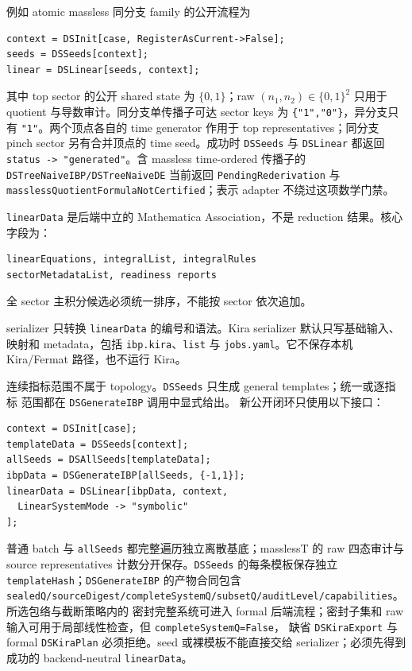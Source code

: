 ﻿\documentclass[a4paper,11pt]{article}
\begin{document}
例如 atomic massless 同分支 family 的公开流程为
\begin{verbatim}
context = DSInit[case, RegisterAsCurrent->False];
seeds = DSSeeds[context];
linear = DSLinear[seeds, context];
\end{verbatim}
其中 top sector 的公开 shared state 为 $\{0,1\}$；raw $(n_1,n_2)\in\{0,1\}^2$ 只用于 quotient 与导数审计。同分支单传播子可达 sector keys 为 \texttt{\{"1","0"\}}，异分支只有 \texttt{"1"}。两个顶点各自的 time generator 作用于 top representatives；同分支 pinch sector 另有合并顶点的 time seed。成功时 \texttt{DSSeeds} 与 \texttt{DSLinear} 都返回 \texttt{status -> "generated"}。含 massless time-ordered 传播子的 \texttt{DSTreeNaiveIBP/DSTreeNaiveDE} 当前返回 \texttt{PendingRederivation} 与 \texttt{masslessQuotientFormulaNotCertified}；表示 adapter 不绕过这项数学门禁。

\texttt{linearData} 是后端中立的 Mathematica Association，不是 reduction 结果。核心字段为：
\begin{verbatim}
linearEquations, integralList, integralRules
sectorMetadataList, readiness reports
\end{verbatim}
全 sector 主积分候选必须统一排序，不能按 sector 依次追加。

serializer 只转换 \texttt{linearData} 的编号和语法。Kira serializer 默认只写基础输入、映射和 metadata，包括 \texttt{ibp.kira}、\texttt{list} 与 \texttt{jobs.yaml}。它不保存本机 Kira/Fermat 路径，也不运行 Kira。

连续指标范围不属于 topology。\texttt{DSSeeds} 只生成 general templates；统一或逐指标
范围都在 \texttt{DSGenerateIBP} 调用中显式给出。
新公开闭环只使用以下接口：
\begin{verbatim}
context = DSInit[case];
templateData = DSSeeds[context];
allSeeds = DSAllSeeds[templateData];
ibpData = DSGenerateIBP[allSeeds, {-1,1}];
linearData = DSLinear[ibpData, context,
  LinearSystemMode -> "symbolic"
];
\end{verbatim}
普通 batch 与 \texttt{allSeeds} 都完整遍历独立离散基底；masslessT 的 raw 四态审计与 source representatives 计数分开保存。\texttt{DSSeeds} 的每条模板保存独立
\texttt{templateHash}；\texttt{DSGenerateIBP} 的产物合同包含
\texttt{sealedQ/sourceDigest/completeSystemQ/subsetQ/auditLevel/capabilities}。所选包络与截断策略内的
密封完整系统可进入 formal 后端流程；密封子集和 raw 输入可用于局部线性检查，但 \texttt{completeSystemQ=False}，
缺省 \texttt{DSKiraExport} 与 formal \texttt{DSKiraPlan} 必须拒绝。seed 或裸模板不能直接交给
serializer；必须先得到成功的 backend-neutral \texttt{linearData}。
\end{document}
